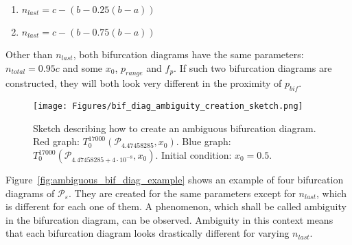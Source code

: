 \begin{enumerate}
    \item $n_{last} = c-(b-0.25(b-a))$
    \item $n_{last} = c-(b-0.75(b-a))$
\end{enumerate}

Other than $n_{last}$, both bifurcation diagrams have the same parameters: $n_{total} = 0.95c$ and some $x_0$, $p_{range}$ and $f_{p}$.
If such two bifurcation diagrams are constructed, they will both look very different in the proximity of $p_{bif}$.

\begin{figure}[!h]
    \centering
    \texttt{[image: Figures/bif\_diag\_ambiguity\_creation\_sketch.png]}
    \caption{
        Sketch describing how to create an ambiguous bifurcation diagram. 
        Red graph: $T^{17000}_{0}(\mathcal{P}_{4.47458285}, x_0)$. 
        Blue graph: $T^{17000}_{0}(\mathcal{P}_{4.47458285+4 \cdot 10^{-8}}, x_0)$. 
        Initial condition: $x_0 = 0.5$.
    }
    \label{fig:ambiguous_bif_diag}
\end{figure}

\par
Figure~\ref{fig:ambiguous_bif_diag_example} shows an example of four bifurcation diagrams of $\mathcal{P}_{\varepsilon}$.
They are created for the same parameters except for $n_{last}$, which is different for each one of them.
A phenomenon, which shall be called ambiguity in the bifurcation diagram, can be observed.
Ambiguity in this context means that each bifurcation diagram looks drastically different for varying $n_{last}$.


